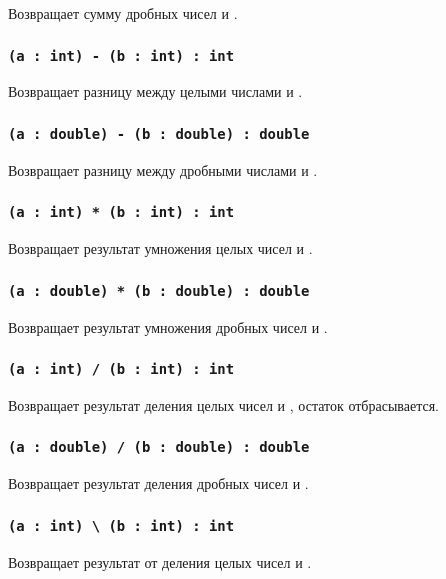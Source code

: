 Возвращает сумму дробных чисел  и .

\subsubsection{\lstinline`(a : int) - (b : int) : int`}

Возвращает разницу между целыми числами  и .

\subsubsection{\lstinline`(a : double) - (b : double) : double`}

Возвращает разницу между дробными числами  и .

\subsubsection{\lstinline`(a : int) * (b : int) : int`}

Возвращает результат умножения целых чисел  и .

\subsubsection{\lstinline`(a : double) * (b : double) : double`}

Возвращает результат умножения дробных чисел  и .

\subsubsection{\lstinline`(a : int) / (b : int) : int`}

Возвращает результат деления целых чисел  и , остаток отбрасывается.

\subsubsection{\lstinline`(a : double) / (b : double) : double`}

Возвращает результат деления дробных чисел  и .

\subsubsection{\lstinline`(a : int) \ (b : int) : int`}

Возвращает результат от деления целых чисел  и .


